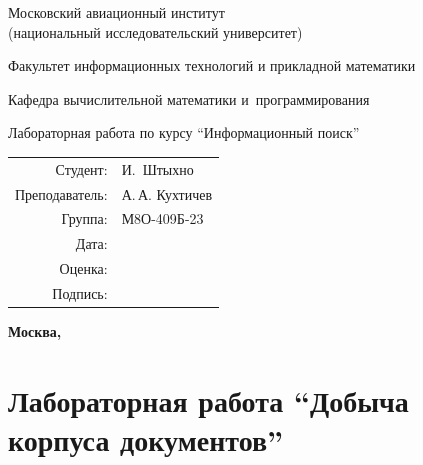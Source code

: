 \documentclass[12pt,a4paper,oneside,fleqn]{article}
\newcommand{\CWHeader}[1]{\section*{#1}}
\newcommand{\StudentName}{И.~Штыхно}
\newcommand{\StudentGroup}{М8О-409Б-23}
\begin{document}
\begin{titlepage}
\begin{center}
\bfseries

{\Large Московский авиационный институт\\ (национальный исследовательский университет)

}

\vspace{48pt}

{\large Факультет информационных технологий и прикладной математики
}

\vspace{36pt}

{\large Кафедра вычислительной математики и~программирования

}

\vspace{48pt}

Лабораторная работа  по курсу \enquote{Информационный поиск}

\end{center}

\vspace{72pt}

\begin{flushright}
\begin{tabular}{rl}
Студент: & \StudentName \\
Преподаватель: & А.\,А. Кухтичев \\
Группа: & \StudentGroup \\
Дата: & \\
Оценка: & \\
Подпись: & \\
\end{tabular}
\end{flushright}

\vfill

\begin{center}
\bfseries
Москва, \the\year
\end{center}
\end{titlepage}

\pagebreak

\CWHeader{Лабораторная работа  \enquote{Добыча корпуса документов}}
\end{document}
